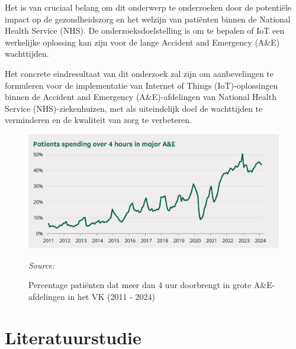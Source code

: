 Het is van cruciaal belang om dit onderwerp te onderzoeken door de potentiële impact op de gezondheidszorg en het welzijn van patiënten binnen de National Health Service (NHS). De onderzoeksdoelstelling is om te bepalen of IoT een werkelijke oplossing kan zijn voor de lange Accident and Emergency (A\&E) wachttijden.

Het concrete eindresultaat van dit onderzoek zal zijn om aanbevelingen te formuleren voor de implementatie van Internet of Things (IoT)-oplossingen binnen de Accident and Emergency (A\&E)-afdelingen van National Health Service (NHS)-ziekenhuizen, met als uiteindelijk doel de wachttijden te verminderen en de kwaliteit van zorg te verbeteren.



\begin{figure}[h]
    \centering
    \includegraphics[width=1\linewidth]{figs/voorstel/Figuur-0.png}
    \caption{Percentage patiënten dat meer dan 4 uur doorbrengt in grote A\&E-afdelingen in het VK (2011 - 2024)}
    \label{fig:Figuur0}
    \textit{Source: \autocite{Baker2024}}
\end{figure}





\section{Literatuurstudie}%
\label{sec:literatuurstudie}


